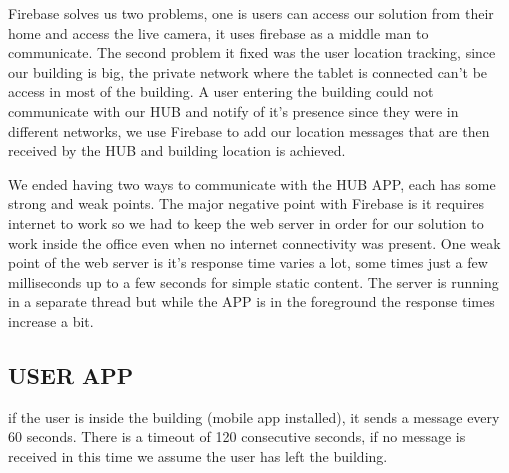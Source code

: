 Firebase solves us two problems, one is users can access our solution from their home and access the live camera, it uses firebase as a middle man to communicate. The second problem it fixed was the user location tracking, since our building is big, the private network where the tablet is connected can't be access in most of the building. A user entering the building could not communicate with our HUB and notify of it's presence since they were in different networks, we use Firebase to add our location messages that are then received by the HUB and building location is achieved.

We ended having two ways to communicate with the HUB APP, each has some strong and weak points. The major negative point with Firebase is it requires internet to work so we had to keep the web server in order for our solution to work inside the office even when no internet connectivity was present. One weak point of the web server is it's response time varies a lot, some times just a few milliseconds up to a few seconds for simple static content. The server is running in a separate thread but while the APP is in the foreground the response times increase a bit.













\subsection{USER APP}

if the user is inside the building (mobile app installed), it sends a message every 60 seconds. There is a timeout of 120 consecutive seconds, if no message is received in this time we assume the user has left the building.





